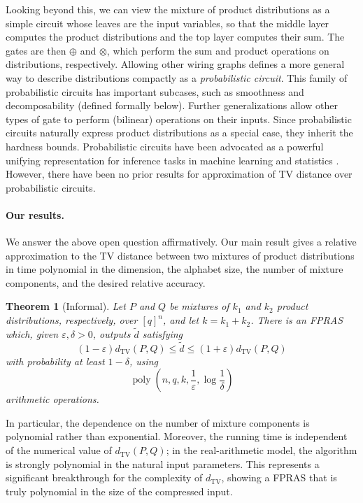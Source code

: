 \documentclass{article}
\newtheorem{theorem}{Theorem}[section]
\begin{document}
Looking beyond this, we can view the mixture of product distributions as a simple circuit whose leaves are the input variables, so that the middle layer computes the product distributions and the top layer computes their sum. 
The gates are then $\oplus$ and $\otimes$, which perform the sum and product operations on distributions, respectively. 
Allowing other wiring graphs defines a more general way to describe distributions compactly as a \textit{probabilistic circuit}.  
This family of probabilistic circuits has important subcases, such as smoothness and decomposability (defined formally below). 
Further generalizations allow other types of gate to perform (bilinear) operations on their inputs. 
Since probabilistic circuits naturally express product distributions as a special case, they inherit the hardness bounds. 
Probabilistic circuits have been advocated as a powerful unifying representation for inference tasks in machine learning and statistics \cite{ChoiVergariVanDenBroeck20,ZhangWangArenasVanDenBroeck25}.
However, there have been no prior results for approximation of TV distance over probabilistic circuits. 

\paragraph{Our results.}
We answer the above open question affirmatively. 
Our main result gives a relative
approximation to the TV distance between two mixtures of product
distributions in time polynomial in the dimension, the alphabet size, the
number of mixture components, and the desired relative accuracy.

\begin{theorem}[Informal]
Let $P$ and $Q$ be mixtures of $k_1$ and $k_2$ product distributions,
respectively, over $[q]^n$, and let $k=k_1+k_2$. There is an FPRAS which,
given $\varepsilon,\delta>0$, outputs $\widetilde d$ satisfying
\[
    (1-\varepsilon)d_{\mathrm{TV}}(P,Q)
    \leq
    \widetilde d
    \leq
    (1+\varepsilon)d_{\mathrm{TV}}(P,Q)
\]
with probability at least $1-\delta$, using
\[
    \operatorname{poly}
    \left(
        n,q,k,\frac{1}{\varepsilon},
        \log\frac{1}{\delta}
    \right)
\]
arithmetic operations.
\end{theorem}

In particular, the dependence on the number of mixture components is
polynomial rather than exponential. 
Moreover, the running time is
independent of the numerical value of $d_{\mathrm{TV}}(P,Q)$; in the
real-arithmetic model, the algorithm is strongly polynomial in the natural
input parameters.
This represents a significant breakthrough for the complexity of $d_{\mathrm{TV}}$, showing a FPRAS that is truly polynomial in the size of the compressed input. 
\end{document}
